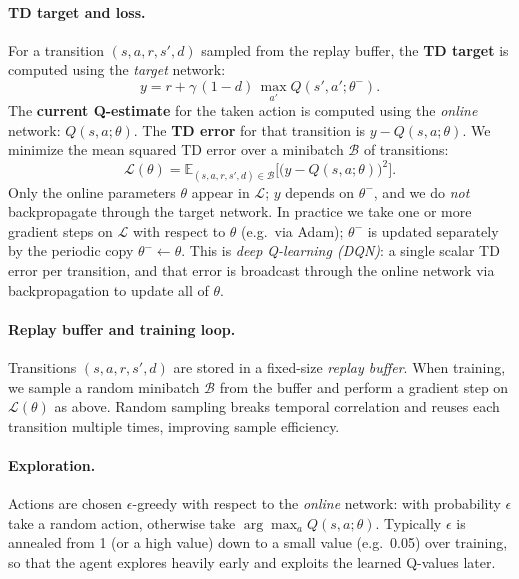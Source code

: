 \documentclass[11pt]{article}
\begin{document}
\paragraph{TD target and loss.} For a transition $(s,a,r,s',d)$ sampled from the replay buffer, the \textbf{TD target} is computed using the \emph{target} network:
\begin{equation}
y = r + \gamma\,(1-d)\,\max_{a'} Q(s', a'; \theta^-).
\end{equation}
The \textbf{current Q-estimate} for the taken action is computed using the \emph{online} network: $Q(s,a;\theta)$. The \textbf{TD error} for that transition is $y - Q(s,a;\theta)$. We minimize the mean squared TD error over a minibatch $\mathcal{B}$ of transitions:
\begin{equation}
\mathcal{L}(\theta) = \mathbb{E}_{(s,a,r,s',d) \in \mathcal{B}}\bigl[ \bigl( y - Q(s,a;\theta) \bigr)^2 \bigr].
\end{equation}
Only the online parameters $\theta$ appear in $\mathcal{L}$; $y$ depends on $\theta^-$, and we do \emph{not} backpropagate through the target network. In practice we take one or more gradient steps on $\mathcal{L}$ with respect to $\theta$ (e.g.\ via Adam); $\theta^-$ is updated separately by the periodic copy $\theta^- \leftarrow \theta$. This is \emph{deep Q-learning (DQN)}: a single scalar TD error per transition, and that error is broadcast through the online network via backpropagation to update all of $\theta$.

\paragraph{Replay buffer and training loop.} Transitions $(s,a,r,s',d)$ are stored in a fixed-size \emph{replay buffer}. When training, we sample a random minibatch $\mathcal{B}$ from the buffer and perform a gradient step on $\mathcal{L}(\theta)$ as above. Random sampling breaks temporal correlation and reuses each transition multiple times, improving sample efficiency.

\paragraph{Exploration.} Actions are chosen $\epsilon$-greedy with respect to the \emph{online} network: with probability $\epsilon$ take a random action, otherwise take $\arg\max_a Q(s,a;\theta)$. Typically $\epsilon$ is annealed from 1 (or a high value) down to a small value (e.g.\ 0.05) over training, so that the agent explores heavily early and exploits the learned Q-values later.
\end{document}
